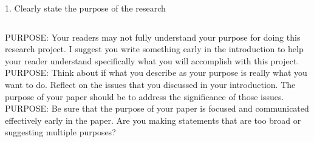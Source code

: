 \documentclass{beamer}
\begin{document}
{\begin{block}{\footnotesize{1. Clearly state the purpose of the research}}
\begin{tiny}
\begin{columns}
PURPOSE:  Your readers may not fully understand your purpose for doing this research project.  I suggest you write something early in the introduction to help your reader understand specifically what you will accomplish with this project.\\
PURPOSE:  Think about if what you describe as your purpose is really what you want to do.  Reflect on the issues that you discussed in your introduction.  The purpose of your paper should be to address the significance of those issues.\\
PURPOSE:  Be sure that the purpose of your paper is focused and communicated effectively early in the paper.  Are you making statements that are too broad or suggesting multiple purposes?
  \end{columns}

  \end{tiny}
  \end{block}
}
\end{document}
